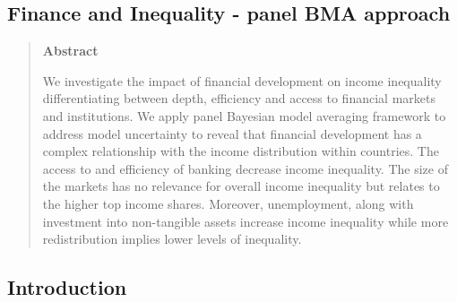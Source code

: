 \begin{refsection}
\chapter{Finance and Inequality - panel BMA approach}
\label{ch4}

\begin{quote}
\begin{center}\textbf{Abstract}\end{center}
  We investigate the impact of financial development on income inequality differentiating between depth, efficiency and access to financial markets and institutions. We apply panel Bayesian model averaging framework to address model uncertainty to reveal that financial development has a complex relationship with the income distribution within countries. The access to and efficiency of banking decrease income inequality. The size of the markets has no relevance for overall income inequality but relates to the higher top income shares. Moreover, unemployment, along with investment into non-tangible assets increase income inequality while more redistribution implies lower levels of inequality.
	\end{quote}

\newpage



\section{Introduction}
\label{ch4sec:intro}


\end{refsection}
